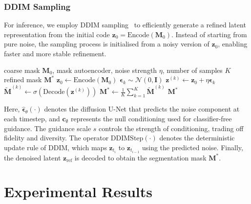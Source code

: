 \documentclass[journal,article,submit,pdftex,moreauthors]{Definitions/mdpi}
\begin{document}
\subsubsection{DDIM Sampling}

For inference, we employ DDIM sampling~\cite{Song2021} to efficiently generate a refined latent representation from the initial code $\mathbf{z}_0=\mathrm{Encode}(\mathbf{M}_0)$. Instead of starting from pure noise, the sampling process is initialised from a noisy version of $\mathbf{z}_0$, enabling faster and more stable refinement.

\begin{algorithm}
\caption{Latent Refinement Sampling}
\label{alg:latent_refinement}
\begin{algorithmic}[1]
\Require coarse mask $\mathbf{M}_0$, mask autoencoder, noise strength $\eta$, number of samples $K$
\Ensure refined mask $\mathbf{M}^*$
\State $\mathbf{z}_0 \gets \mathrm{Encode}(\mathbf{M}_0)$
  \State $\boldsymbol{\epsilon}_k \sim \mathcal{N}(0,\mathbf{I})$
  \State $\mathbf{z}^{(k)} \gets \mathbf{z}_0 + \eta\boldsymbol{\epsilon}_k$
  \State $\tilde{\mathbf{M}}^{(k)} \gets \sigma(\mathrm{Decode}(\mathbf{z}^{(k)}))$
\EndFor
\State $\mathbf{M}^* \gets \frac{1}{K}\sum_{k=1}^{K}\tilde{\mathbf{M}}^{(k)}$
\State \Return $\mathbf{M}^*$
\end{algorithmic}
\end{algorithm}

Here, $\hat{\boldsymbol{\epsilon}}_\theta(\cdot)$ denotes the diffusion U-Net that predicts the noise component at each timestep, and $\mathbf{c}_\emptyset$ represents the null conditioning used for classifier-free guidance. The guidance scale $s$ controls the strength of conditioning, trading off fidelity and diversity. The operator $\mathrm{DDIMStep}(\cdot)$ denotes the deterministic update rule of DDIM, which maps $\mathbf{z}_{t_i}$ to $\mathbf{z}_{t_{i-1}}$ using the predicted noise. Finally, the denoised latent $\mathbf{z}_{\mathrm{ref}}$ is decoded to obtain the segmentation mask $\mathbf{M}^*$.

\section{Experimental Results}
\label{sec:experiments_results}
\end{document}
